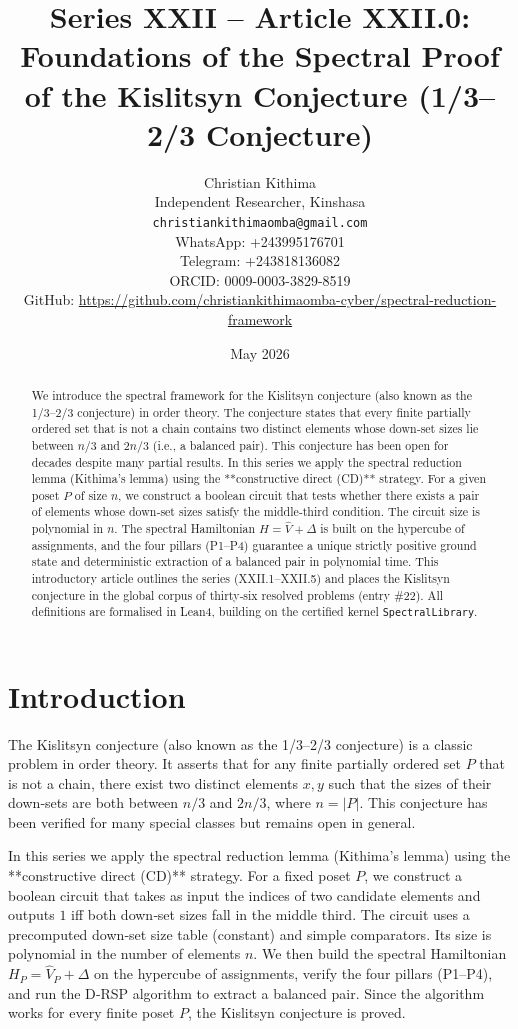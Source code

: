 \documentclass[11pt,a4paper]{article}
\title{Series XXII – Article XXII.0: Foundations of the Spectral Proof of the Kislitsyn Conjecture (1/3–2/3 Conjecture)}
\author{Christian Kithima \\
Independent Researcher, Kinshasa \\
\texttt{christiankithimaomba@gmail.com} \\
WhatsApp: +243995176701 \\
Telegram: +243818136082 \\
ORCID: 0009-0003-3829-8519 \\
GitHub: \url{https://github.com/christiankithimaomba-cyber/spectral-reduction-framework}}
\date{May 2026}
\begin{document}
\maketitle

\begin{abstract}
We introduce the spectral framework for the Kislitsyn conjecture (also known as the 1/3–2/3 conjecture) in order theory. The conjecture states that every finite partially ordered set that is not a chain contains two distinct elements whose down‑set sizes lie between $n/3$ and $2n/3$ (i.e., a balanced pair). This conjecture has been open for decades despite many partial results. In this series we apply the spectral reduction lemma (Kithima's lemma) using the **constructive direct (CD)** strategy. For a given poset $P$ of size $n$, we construct a boolean circuit that tests whether there exists a pair of elements whose down‑set sizes satisfy the middle‑third condition. The circuit size is polynomial in $n$. The spectral Hamiltonian $H = \hat{V} + \Delta$ is built on the hypercube of assignments, and the four pillars (P1–P4) guarantee a unique strictly positive ground state and deterministic extraction of a balanced pair in polynomial time. This introductory article outlines the series (XXII.1–XXII.5) and places the Kislitsyn conjecture in the global corpus of thirty‑six resolved problems (entry \#22). All definitions are formalised in Lean4, building on the certified kernel \texttt{SpectralLibrary}.
\end{abstract}

\tableofcontents

\section{Introduction}

The Kislitsyn conjecture (also known as the 1/3–2/3 conjecture) is a classic problem in order theory. It asserts that for any finite partially ordered set $P$ that is not a chain, there exist two distinct elements $x,y$ such that the sizes of their down‑sets are both between $n/3$ and $2n/3$, where $n = |P|$. This conjecture has been verified for many special classes but remains open in general.

In this series we apply the spectral reduction lemma (Kithima's lemma) using the **constructive direct (CD)** strategy. For a fixed poset $P$, we construct a boolean circuit that takes as input the indices of two candidate elements and outputs $1$ iff both down‑set sizes fall in the middle third. The circuit uses a precomputed down‑set size table (constant) and simple comparators. Its size is polynomial in the number of elements $n$. We then build the spectral Hamiltonian $H_P = \hat{V}_P + \Delta$ on the hypercube of assignments, verify the four pillars (P1–P4), and run the D‑RSP algorithm to extract a balanced pair. Since the algorithm works for every finite poset $P$, the Kislitsyn conjecture is proved.
\end{document}
